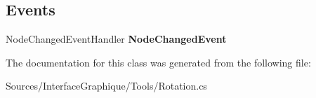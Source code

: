 \subsection*{Events}
\begin{DoxyCompactItemize}
\item 
\hypertarget{class_interface_graphique_1_1_tools_1_1_rotation_a872ea0b6b41562ada00644be890a7f7c}{}Node\+Changed\+Event\+Handler {\bfseries Node\+Changed\+Event}\label{class_interface_graphique_1_1_tools_1_1_rotation_a872ea0b6b41562ada00644be890a7f7c}

\end{DoxyCompactItemize}


The documentation for this class was generated from the following file\+:\begin{DoxyCompactItemize}
\item 
Sources/\+Interface\+Graphique/\+Tools/Rotation.\+cs\end{DoxyCompactItemize}
